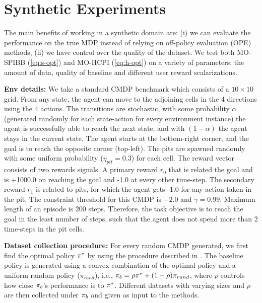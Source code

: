 \section{Synthetic Experiments}
\label{sec:synthetic-experiments}

The main benefits of working in a synthetic domain are: (i) we can evaluate the performance on the true MDP instead of relying on off-policy evaluation (OPE) methods, (ii) we have control over the quality of the dataset. We test both 
MO-SPIBB (\ref{eq:s-opt}) and MO-HCPI (\ref{eq:h-opt}) on a variety of parameters: the amount of data, quality of baseline and different user reward scalarizations. 

\textbf{Env details:} 
We take a standard CMDP benchmark \citep{leike2017ai, chow2018lyapunov} which consists of a $10\times10$ grid. From any state, the agent can move to the adjoining cells in the 4 directions using the 4 actions. 
The transitions are stochastic, with some probability $\alpha$ (generated randomly for each state-action for every environment instance) the agent is successfully able to reach the next state, and with $(1-\alpha)$ the agent stays in the current state. 
The agent starts at the bottom-right corner, and the goal is to reach the opposite corner (top-left). The pits are spawned randomly with some uniform probability ($\eta_{pit}=0.3$) for each cell.  
The reward vector consists of two rewards signals. A primary reward $r_0$ that is related the goal and is +1000.0 on reaching the goal and -1.0 at every other time-step. The secondary reward $r_1$ is related to pits, for which the agent gets -1.0 for any action taken in the pit.
The constraint threshold for this CMDP is $-2.0$ and $\gamma = 0.99$. Maximum length of an episode is $200$ steps. Therefore, the task objective is to reach the goal in the least number of steps, such that the agent does not spend more than $2$ time-steps in the pit cells. 

\textbf{Dataset collection procedure:} 
For every random CMDP generated, we first find the optimal policy $\pi^{*}$ by using the procedure described in . The baseline policy is generated using a convex combination of the optimal policy and a uniform random policy ($\pi_{rand}$), i.e., $\pi_{b} = \rho \pi^{*} + (1 - \rho) \pi_{rand}$, where  $\rho$ controls how close $\pi_{b}$'s performance is to $\pi^{*}$. Different datasets with varying sizes and $\rho$ are then collected under $\pi_{b}$ and given as input to the methods.

